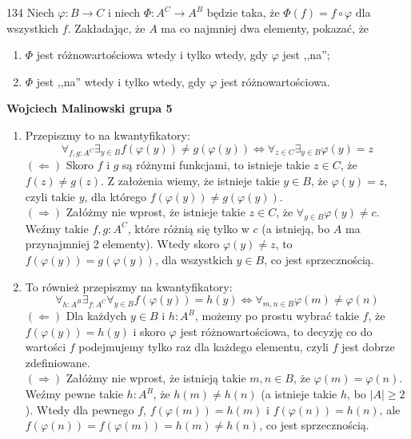 \documentclass{../note}
\begin{document}
\begin{zadanie}{134}
Niech $\varphi:B\rightarrow C$ i niech $\Phi:A^{C}\rightarrow A^{B}$ będzie taka, że $\Phi(f)=f\circ\varphi$ dla wszystkich $f$.
Zakładając, że $A$ ma co najmniej dwa elementy, pokazać, że
\begin{enumerate}[label=(\alph*)]
    \item $\Phi$ jest różnowartościowa wtedy i tylko wtedy, gdy $\varphi$ jest ,,na'';
    \item $\Phi$ jest ,,na'' wtedy i tylko wtedy, gdy $\varphi$ jest różnowartościowa.
\end{enumerate}
\end{zadanie}
\begin{rozwiazanie}
\newpage
\textbf{Wojciech Malinowski grupa 5}
\begin{enumerate}[label=(\alph*)]
    \item Przepiszmy to na kwantyfikatory:
    \[\forall_{f,g : A^C} \exists_{y \in B} f(\varphi(y)) \neq g(\varphi(y)) \Leftrightarrow \forall_{z \in C} \exists_{y \in B} \varphi(y) = z\]
    $(\Leftarrow)$ Skoro $f$ i $g$ są różnymi funkcjami, to istnieje takie $z \in C$, że $f(z) \neq g(z)$. Z założenia wiemy, że istnieje takie $y \in B$, że $\varphi(y) = z$, czyli takie $y$, dla którego $f(\varphi(y)) \neq g(\varphi(y))$.\\
    $(\Rightarrow)$ Załóżmy nie wprost, że istnieje takie $z \in C$, że $\forall_{y \in B} \varphi(y) \neq c$. Weźmy takie $f, g: A^C$, które różnią się tylko w $c$ (a istnieją, bo $A$ ma przynajmniej 2 elementy). Wtedy skoro $\varphi(y) \neq z$, to $f(\varphi(y)) = g(\varphi(y))$, dla wszystkich $y \in B$, co jest sprzecznością.
    \item To również przepiszmy na kwantyfikatory:
    \[\forall_{h : A^B} \exists_{f : A^C} \forall_{y \in B} f(\varphi(y)) = h(y) \Leftrightarrow \forall_{m, n \in B} \varphi(m) \neq \varphi(n)\]
    $(\Leftarrow)$ Dla każdych $y \in B$ i $h : A^B$, możemy po prostu wybrać takie $f$, że $f(\varphi(y)) = h(y)$ i skoro $\varphi$ jest różnowartościowa, to decyzję co do wartości $f$ podejmujemy tylko raz dla każdego elementu, czyli $f$ jest dobrze zdefiniowane.\\
    $(\Rightarrow)$ Załóżmy nie wprost, że istnieją takie $m, n \in B$, że $\varphi(m) = \varphi(n)$. Weźmy pewne takie $h : A^B$, że $h(m) \neq h(n)$ (a istnieje takie $h$, bo $|A| \geq 2$). Wtedy dla pewnego $f$, $f(\varphi(m)) = h(m)$ i $f(\varphi(n)) = h(n)$, ale $f(\varphi(n)) = f(\varphi(m)) = h(m) \neq h(n)$, co jest sprzecznością.
\end{enumerate}
\end{rozwiazanie}
\end{document}
